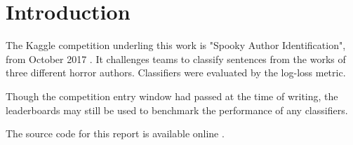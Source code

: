 \section{Introduction}
\label{sec:intro}
The Kaggle competition underling this work is "Spooky Author Identification", from October 2017 \cite{kaggle}. It challenges teams to classify sentences from the works of three
different horror authors. Classifiers were evaluated by the log-loss metric.

Though the competition entry window had passed at the time of writing, the leaderboards may still be used to benchmark the performance of any classifiers.

The source code for this report is available online \cite{source-code}.
